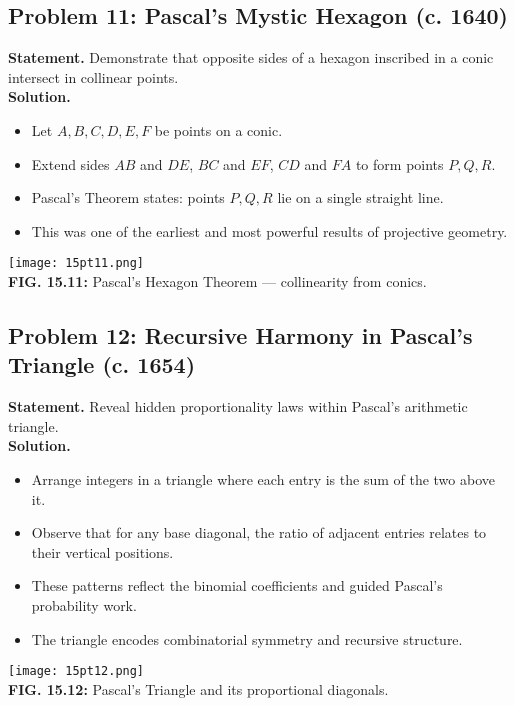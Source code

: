 \documentclass[9pt]{article}
\begin{document}
\newpage

\subsection*{Problem 11: Pascal’s Mystic Hexagon (c. 1640)}
\textbf{Statement.} Demonstrate that opposite sides of a hexagon inscribed in a conic intersect in collinear points. \\
\textbf{Solution.}
\begin{itemize}
  \item Let \( A, B, C, D, E, F \) be points on a conic.
  \item Extend sides \( AB \) and \( DE \), \( BC \) and \( EF \), \( CD \) and \( FA \) to form points \( P, Q, R \).
  \item Pascal’s Theorem states: points \( P, Q, R \) lie on a single straight line.
  \item This was one of the earliest and most powerful results of projective geometry.
\end{itemize}
\begin{center}
\texttt{[image: 15pt11.png]} \\
\textbf{FIG. 15.11:} Pascal’s Hexagon Theorem — collinearity from conics.
\end{center}

\newpage

\subsection*{Problem 12: Recursive Harmony in Pascal’s Triangle (c. 1654)}
\textbf{Statement.} Reveal hidden proportionality laws within Pascal’s arithmetic triangle. \\
\textbf{Solution.}
\begin{itemize}
  \item Arrange integers in a triangle where each entry is the sum of the two above it.
  \item Observe that for any base diagonal, the ratio of adjacent entries relates to their vertical positions.
  \item These patterns reflect the binomial coefficients and guided Pascal’s probability work.
  \item The triangle encodes combinatorial symmetry and recursive structure.
\end{itemize}
\begin{center}
\texttt{[image: 15pt12.png]} \\
\textbf{FIG. 15.12:} Pascal’s Triangle and its proportional diagonals.
\end{center}
\end{document}
